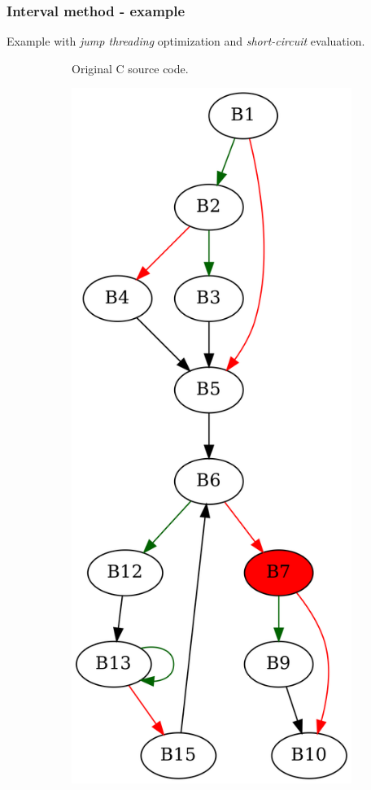\documentclass[aspectratio=1610]{beamer}
\begin{document}
\begin{frame}[noframenumbering]
	\frametitle{Interval method - example}
	Example with \textit{jump threading} optimization and \textit{short-circuit} evaluation.
	\begin{figure}[htbp]
		\centering
		\begin{subfigure}[b]{0.30\textwidth}
			\centering
			
			\caption{Original C source code.}
		\end{subfigure}
		\begin{subfigure}[b]{0.50\textwidth}
			\centering
			\includegraphics[height=0.6\paperheight]{inc/methods/interval/example/sample/f_0004b.png}

\end{subfigure}
\end{figure}
\end{frame}
\end{document}
